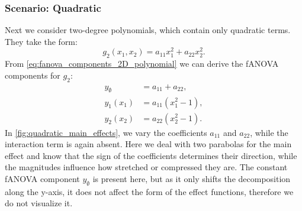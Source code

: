 

\subsubsection*{Scenario: Quadratic}
Next we consider two-degree polynomials, which contain only quadratic terms. They take the form: $$g_2(x_1, x_2) = a_{11} x_1^2 + a_{22} x_2^2.$$
From \autoref{eq:fanova_components_2D_polynomial} we can derive the fANOVA components for $g_2$:
\begin{align*}
    y_{\emptyset} &= a_{11} + a_{22}, \\
    y_1(x_1) &= a_{11}(x_1^2 - 1), \\
    y_2(x_2) &= a_{22}(x_2^2 - 1).
\end{align*}
In \autoref{fig:quadratic_main_effects}, we vary the coefficients $a_{11}$ and $a_{22}$, while the interaction term is again absent.
Here we deal with two parabolas for the main effect and know that the sign of the coefficients determines their direction, while the magnitudes influence how stretched or compressed they are. The constant fANOVA component $y_{\emptyset}$ is present here, but as it only shifts the decomposition along the y-axis, it does not affect the form of the effect functions, therefore we do not visualize it.

